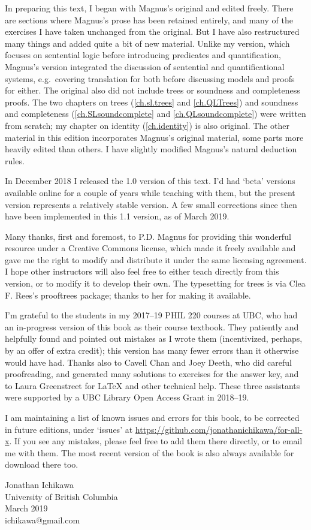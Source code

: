 In preparing this text, I began with Magnus's original and edited freely. There are sections where Magnus's prose has been retained entirely, and many of the exercises I have taken unchanged from the original. But I have also restructured many things and added quite a bit of new material. Unlike my version, which focuses on sentential logic before introducing predicates and quantification, Magnus's version integrated the discussion of sentential and quantificational systems, e.g.\ covering translation for both before discussing models and proofs for either. The original also did not include trees or soundness and completeness proofs. The two chapters on trees (\ref{ch.sl.trees} and \ref{ch.QLTrees}) and soundness and completeness (\ref{ch.SLsoundcomplete} and \ref{ch.QLsoundcomplete}) were written from scratch; my chapter on identity (\ref{ch.identity}) is also original. The other material in this edition incorporates Magnus's original material, some parts more heavily edited than others. I have slightly modified Magnus's natural deduction rules.

In December 2018 I released the 1.0 version of this text. I'd had `beta' versions available online for a couple of years while teaching with them, but the present version represents a relatively stable version. A few small corrections since then have been implemented in this 1.1 version, as of March 2019.

Many thanks, first and foremost, to P.D. Magnus for providing this wonderful resource under a Creative Commons license, which made it freely available and gave me the right to modify and distribute it under the same licensing agreement. I hope other instructors will also feel free to either teach directly from this version, or to modify it to develop their own. The typesetting for trees is via Clea F. Rees's prooftrees package; thanks to her for making it available.

I'm grateful to the students in my 2017--19 PHIL 220 courses at UBC, who had an in-progress version of this book as their course textbook. They patiently and helpfully found and pointed out mistakes as I wrote them (incentivized, perhaps, by an offer of extra credit); this version has many fewer errors than it otherwise would have had. Thanks also to Cavell Chan and Joey Deeth, who did careful proofreading, and generated many solutions to exercises for the answer key, and to Laura Greenstreet for LaTeX and other technical help. These three assistants were supported by a UBC Library Open Access Grant in 2018--19.

I am maintaining a list of known issues and errors for this book, to be corrected in future editions, under `issues' at \url{https://github.com/jonathanichikawa/for-all-x}. If you see any mistakes, please feel free to add them there directly, or to email me with them. The most recent version of the book is also always available for download there too.

\begin{flushright}
Jonathan Ichikawa \\
University of British Columbia \\
March 2019 \\
ichikawa@gmail.com
\end{flushright}
